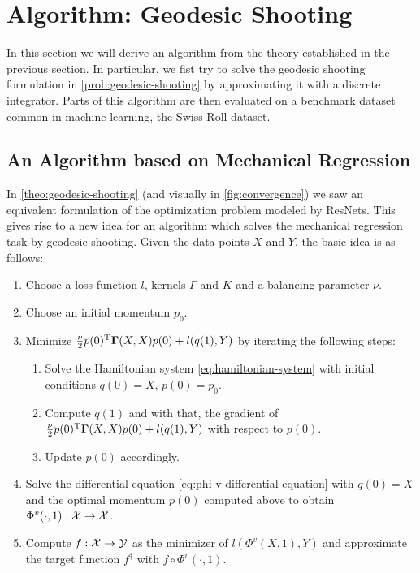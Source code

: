 \section{Algorithm: Geodesic Shooting}

In this section we will derive an algorithm from the theory established in the previous section.
In particular, we fist try to solve the geodesic shooting formulation in \cref{prob:geodesic-shooting} by approximating it with a discrete integrator.
Parts of this algorithm are then evaluated on a benchmark dataset common in machine learning, the Swiss Roll dataset.

\subsection{An Algorithm based on Mechanical Regression}

In \cref{theo:geodesic-shooting} (and visually in \cref{fig:convergence}) we saw an equivalent formulation of the optimization problem modeled by ResNets.
This gives rise to a new idea for an algorithm which solves the mechanical regression task by geodesic shooting.
Given the data points $X$ and $Y$, the basic idea is as follows:
\begin{enumerate}[label=\arabic*.]
	\item Choose a loss function $l$, kernels $\Gamma$ and $K$ and a balancing parameter $\nu$.
	\item Choose an initial momentum $p_0$.
	\item Minimize $\frac{\nu}{2} p(0)^{\mathrm{T}} \mathbf{\Gamma}(X, X)p(0) + l(q(1), Y)$ by iterating the following steps:
	\begin{enumerate}[label=\arabic*.]
		\item Solve the Hamiltonian system \ref{eq:hamiltonian-system} with initial conditions $q(0) = X$, $p(0) = p_0$.
		\item Compute $q(1)$ and with that, the gradient of $\frac{\nu}{2} p(0)^{\mathrm{T}} \mathbf{\Gamma}(X, X)p(0) + l(q(1), Y)$ with respect to $p(0)$.
		\item Update $p(0)$ accordingly.
	\end{enumerate}
	\item Solve the differential equation \ref{eq:phi-v-differential-equation} with $q(0) = X$ and the optimal momentum $p(0)$ computed above to obtain $\Phi^v(\cdot, 1): \mathcal{X} \rightarrow \mathcal{X}$.
	\item Compute $f: \mathcal{X} \rightarrow \mathcal{Y}$ as the minimizer of $l(\Phi^v(X, 1), Y)$ and approximate the target function $f^\dagger$ with $f \circ \Phi^v(\cdot, 1)$.
\end{enumerate}

